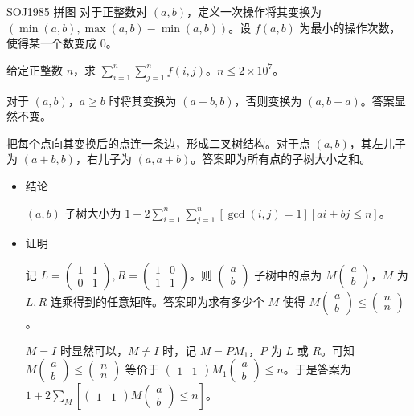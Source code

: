\documentclass [hyperref={bookmarksdepth=4}, aspectratio=169] {beamer}
\theoremstyle {fy}
\begin{document}
\begin{frame}{SOJ1985 拼图}
对于正整数对 $(a,b)$，定义一次操作将其变换为 $(\min(a,b),\max(a,b)-\min(a,b))$。设 $f(a,b)$ 为最小的操作次数，使得某一个数变成 $0$。

给定正整数 $n$，求 $\sum\limits_{i=1}^n\sum\limits_{j=1}^nf(i,j)$。$n\le 2\times10^7$。

对于 $(a,b)$，$a\ge b$ 时将其变换为 $(a-b,b)$，否则变换为 $(a,b-a)$。答案显然不变。

把每个点向其变换后的点连一条边，形成二叉树结构。对于点 $(a,b)$，其左儿子为 $(a+b,b)$，右儿子为 $(a,a+b)$。答案即为所有点的子树大小之和。

\begin{itemize}
    \item 结论

  $(a,b)$ 子树大小为 $1+2\sum\limits_{i=1}^n\sum\limits_{j=1}^n[\gcd(i,j)=1][ai+bj\le n]$。

    \item 证明

  记 $L=\begin{pmatrix}1 & 1\\0 & 1\end{pmatrix},R=\begin{pmatrix}1 & 0\\1 & 1\end{pmatrix}$。则 $\begin{pmatrix}a\\b\end{pmatrix}$ 子树中的点为 $M\begin{pmatrix}a\\b\end{pmatrix}$，$M$ 为 $L,R$ 连乘得到的任意矩阵。答案即为求有多少个 $M$ 使得 $M\begin{pmatrix}a\\b\end{pmatrix}\le\begin{pmatrix}n\\n\end{pmatrix}$。

  $M=I$ 时显然可以，$M\neq I$ 时，记 $M=PM_1$，$P$ 为 $L$ 或 $R$。可知 $M\begin{pmatrix}a\\b\end{pmatrix}\le\begin{pmatrix}n\\n\end{pmatrix}$ 等价于 $\begin{pmatrix}1 & 1\end{pmatrix}M_1\begin{pmatrix}a\\b\end{pmatrix}\le n$。于是答案为 $1+2\sum\limits_{M}[\begin{pmatrix}1 & 1\end{pmatrix}M\begin{pmatrix}a\\b\end{pmatrix}\le n]$。


\end{itemize}
\end{frame}
\end{document}

